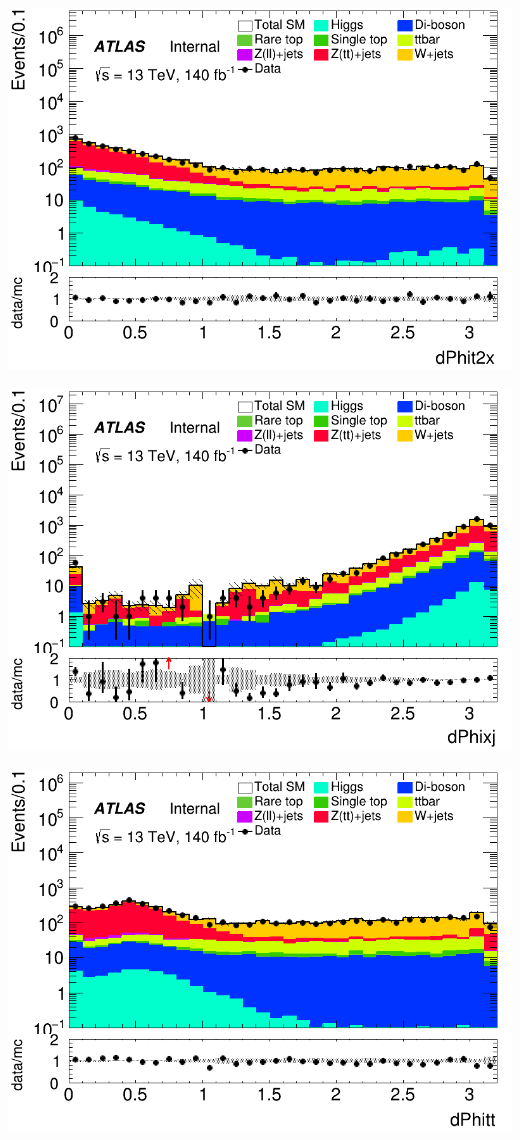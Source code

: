 \documentclass[usenames,dvipsnames]{beamer}
\begin{document}
\begin{frame}
    \begin{minipage}{0.32\textwidth}
        \centering
        \includegraphics[width=\textwidth]{graphics/H_met/H_met_dPhit2x.png}
    \end{minipage}
    \hfill
    \begin{minipage}{0.32\textwidth}
        \centering
        \includegraphics[width=\textwidth]{graphics/H_met/H_met_dPhixj.png}
    \end{minipage}
    \hfill
    \begin{minipage}{0.32\textwidth}
        \centering
        \includegraphics[width=\textwidth]{graphics/H_met/H_met_dPhitt.png}

\end{minipage}
\end{frame}
\end{document}
